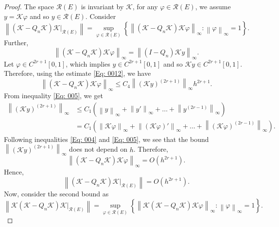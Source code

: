 \documentclass[pdflatex, sn-mathphys-num]{sn-jnl}%
\newcommand{\norm}[1]{\left\lVert #1\right\rVert}
\theoremstyle{thmstyleone}%
\theoremstyle{thmstyletwo}%
\theoremstyle{thmstylethree}%
\begin{document}
\begin{proof}
	The space \(\mathcal{R}(E)\) is invariant by \(\mathcal{K}\), for any \(\varphi \in \mathcal{R}(E)\), we assume \(y= \mathcal{K}\varphi\) and so \(y \in \mathcal{R}(E)\). Consider 
	\begin{equation*}
		\norm{(\mathcal{K} - Q_n \mathcal{K}) \mathcal{K} |_{\mathcal{R}(E)} } = \sup_{\varphi \in \mathcal{R}(E)}\left\{ \norm{(\mathcal{K} - Q_n \mathcal{K}) \mathcal{K} \varphi }_\infty : \norm{\varphi}_\infty =1 \right\}.
	\end{equation*}
	Further, 
	\begin{equation*}
		\norm{(\mathcal{K} - Q_n \mathcal{K}) \mathcal{K} \varphi }_\infty = \norm{(I - Q_n) \mathcal{K} y }_\infty.
	\end{equation*}
	Let \(\varphi \in C^{2r+1}[0,1]\), which implies \(y \in C^{2r+1}[0,1]\) and so \(\mathcal{K}y \in C^{2r+1}[0,1]\). Therefore, using the estimate \eqref{Eq: 0012}, we have
	\begin{equation*}
		\norm{(\mathcal{K} - Q_n \mathcal{K}) \mathcal{K} \varphi }_\infty \leq C_4 \norm{\left(\mathcal{K}y\right)^{(2r+1)}}_\infty h^{2r+1}.
	\end{equation*}
	From inequality \eqref{Eq: 005}, we get
	\begin{align*}
		\norm{\left(\mathcal{K}y\right)^{(2r+1)}}_\infty &\leq C_1 \left(\norm{y}_\infty + \norm{y'}_\infty + \ldots + \norm{y^{(2r-1)}}_\infty\right) \\
		&= C_1 \left(\norm{\mathcal{K}\varphi}_\infty + \norm{(\mathcal{K}\varphi)'}_\infty + \ldots + \norm{(\mathcal{K}\varphi)^{(2r-1)}}_\infty\right).
	\end{align*}
	Following inequalities \eqref{Eq: 004} and \eqref{Eq: 005}, we see that the bound \(	\norm{\left(\mathcal{K}y\right)^{(2r+1)}}_\infty\) does not depend on \(h\). Therefore,
	\begin{equation*}
		\norm{(\mathcal{K} - Q_n \mathcal{K}) \mathcal{K} \varphi }_\infty = O\left(h^{2r+1}\right).
	\end{equation*}
	Hence, 
	\begin{equation*}
		\norm{(\mathcal{K} - Q_n \mathcal{K}) \mathcal{K} |_{\mathcal{R}(E)} } = O\left(h^{2r +1}\right).
	\end{equation*}
	Now, consider the second bound as
	\begin{equation*}
		\norm{ \mathcal{K} (\mathcal{K} - Q_n \mathcal{K}) \mathcal{K} |_{\mathcal{R}(E)} } = \sup_{\varphi \in \mathcal{R}(E)}\left\{ \norm{\mathcal{K}(\mathcal{K} - Q_n \mathcal{K}) \mathcal{K} \varphi }_\infty : \norm{\varphi}_\infty =1 \right\}.

\end{equation*}
\end{proof}
\end{document}
